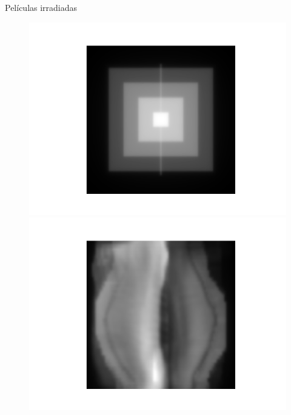 \documentclass[12pt]{beamer}
\begin{document}
\begin{frame}{Películas irradiadas}
\begin{figure}[htp]%
	\centering
	\begin{minipage}{0.45\textwidth}
		\includegraphics[width=\textwidth]{images/piramideTPS.png}
	\end{minipage}\hfill
	\begin{minipage}{0.45\textwidth}
		\includegraphics[width=\textwidth]{images/mamaTPS.png}
	\end{minipage}\par
	\begin{minipage}{0.45\textwidth}

\end{minipage}
\end{figure}
\end{frame}
\end{document}
